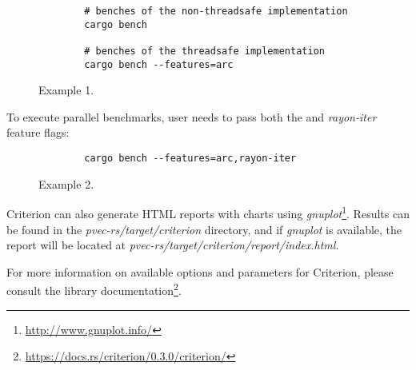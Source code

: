 \begin{figure}[!htbp]
    \centering

    \begin{verbatim}
        # benches of the non-threadsafe implementation
        cargo bench

        # benches of the threadsafe implementation
        cargo bench --features=arc 
    \end{verbatim}
    
    \caption{Example 1.}
    \label{fig:sequential-benches}
\end{figure}

To execute parallel benchmarks, user needs to pass both the \arc{} and \emph{rayon-iter} feature flags: 

\begin{figure}[!htbp]
    \centering

    \begin{verbatim}
        cargo bench --features=arc,rayon-iter
    \end{verbatim}
    
    \caption{Example 2.}
    \label{fig:parallel-benches}
\end{figure}

Criterion can also generate HTML reports with charts using \emph{gnuplot}\footnote{\url{http://www.gnuplot.info/}}. Results can be found in the \emph{pvec-rs/target/criterion} directory, and if \emph{gnuplot} is available, the report will be located at \emph{pvec-rs/target/criterion/report/index.html}. 

For more information on available options and parameters for Criterion, please consult the library documentation\footnote{\url{https://docs.rs/criterion/0.3.0/criterion/}}.
